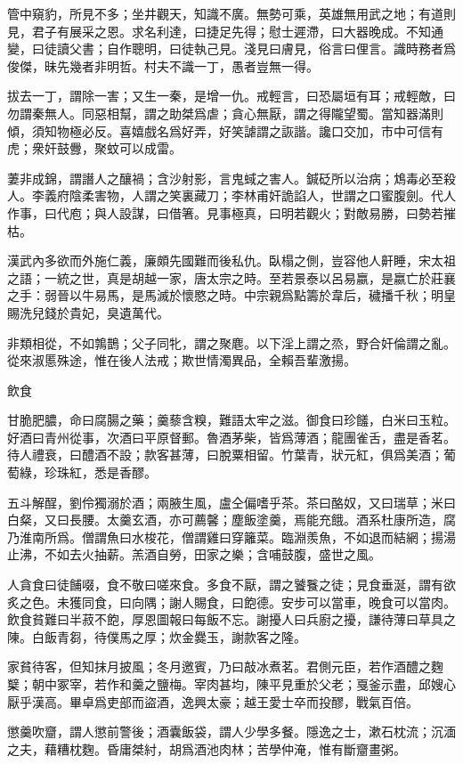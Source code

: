 \documentclass[12pt,a4paper]{ctexbook}
\begin{document}
管中窺豹，所見不多；坐井觀天，知識不廣。無勢可乘，英雄無用武之地；有道則見，君子有展采之恩。求名利達，曰捷足先得；慰士遲滯，曰大器晚成。不知通變，曰徒讀父書；自作聰明，曰徒執己見。淺見曰膚見，俗言曰俚言。識時務者爲俊傑，昧先幾者非明哲。村夫不識一丁，愚者豈無一得。\par
拔去一丁，謂除一害；又生一秦，是增一仇。戒輕言，曰恐屬垣有耳；戒輕敵，曰勿謂秦無人。同惡相幫，謂之助桀爲虐；貪心無厭，謂之得隴望蜀。當知器滿則傾，須知物極必反。喜嬉戲名爲好弄，好笑謔謂之詼諧。讒口交加，市中可信有虎；衆奸鼓釁，聚蚊可以成雷。\par
萋非成錦，謂譖人之釀禍；含沙射影，言鬼蜮之害人。鍼砭所以治病；鴆毒必至殺人。李義府陰柔害物，人謂之笑裏藏刀；李林甫奸詭諂人，世謂之口蜜腹劍。代人作事，曰代庖；與人設謀，曰借箸。見事極真，曰明若觀火；對敵易勝，曰勢若摧枯。\par
漢武內多欲而外施仁義，廉頗先國難而後私仇。臥榻之側，豈容他人鼾睡，宋太祖之語；一統之世，真是胡越一家，唐太宗之時。至若景泰以呂易嬴，是嬴亡於莊襄之手：弱晉以牛易馬，是馬滅於懷愍之時。中宗親爲點籌於韋后，穢播千秋；明皇賜洗兒錢於貴妃，臭遺萬代。\par
非類相從，不如鶉鵲；父子同牝，謂之聚麀。以下淫上謂之烝，野合奸倫謂之亂。從來淑慝殊途，惟在後人法戒；欺世情濁異品，全賴吾輩激揚。\par
飲食\par
甘脆肥膿，命曰腐腸之藥；羹藜含糗，難語太牢之滋。御食曰珍饈，白米曰玉粒。好酒曰青州從事，次酒曰平原督郵。魯酒茅柴，皆爲薄酒；龍團雀舌，盡是香茗。待人禮衰，曰醴酒不設；款客甚薄，曰脫粟相留。竹葉青，狀元紅，俱爲美酒；葡萄綠，珍珠紅，悉是香醪。\par
五斗解酲，劉伶獨溺於酒；兩腋生風，盧仝偏嗜乎茶。茶曰酪奴，又曰瑞草；米曰白粲，又曰長腰。太羹玄酒，亦可薦馨；塵飯塗羹，焉能充餓。酒系杜康所造，腐乃淮南所爲。僧謂魚曰水梭花，僧謂雞曰穿籬菜。臨淵羨魚，不如退而結網；揚湯止沸，不如去火抽薪。羔酒自勞，田家之樂；含哺鼓腹，盛世之風。\par
人貪食曰徒餔啜，食不敬曰嗟來食。多食不厭，謂之饕餮之徒；見食垂涎，謂有欲炙之色。未獲同食，曰向隅；謝人賜食，曰飽德。安步可以當車，晚食可以當肉。飲食貧難曰半菽不飽，厚恩圖報曰每飯不忘。謝擾人曰兵廚之擾，謙待薄曰草具之陳。白飯青芻，待僕馬之厚；炊金爨玉，謝款客之隆。\par
家貧待客，但知抹月披風；冬月邀賓，乃曰敲冰煮茗。君側元臣，若作酒醴之麴櫱；朝中冢宰，若作和羹之鹽梅。宰肉甚均，陳平見重於父老；戛釜示盡，邱嫂心厭乎漢高。畢卓爲吏部而盜酒，逸興太豪；越王愛士卒而投醪，戰氣百倍。\par
懲羹吹齏，謂人懲前警後；酒囊飯袋，謂人少學多餐。隱逸之士，漱石枕流；沉湎之夫，藉糟枕麴。昏庸桀紂，胡爲酒池肉林；苦學仲淹，惟有斷齏畫粥。\par
\end{document}
